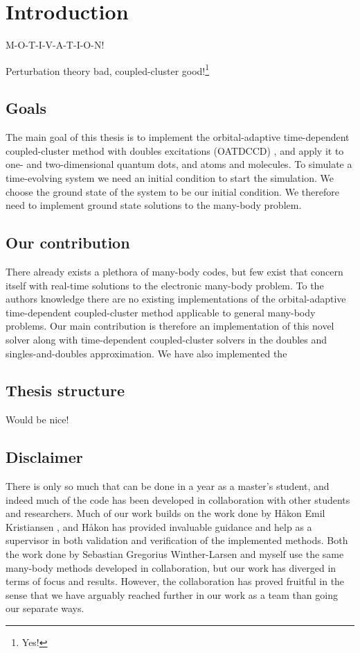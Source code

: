 \chapter{Introduction}
    M-O-T-I-V-A-T-I-O-N!

    Perturbation theory bad, coupled-cluster good!\footnote{Yes!}

    \section{Goals}
        The main goal of this thesis is to implement the orbital-adaptive
        time-dependent coupled-cluster method with doubles excitations (OATDCCD)
        \cite{kvaal2012ab}, and apply it to one- and two-dimensional quantum
        dots, and atoms and molecules.
        To simulate a time-evolving system we need an initial condition to start
        the simulation.
        We choose the ground state of the system to be our initial condition.
        We therefore need to implement ground state solutions to the many-body
        problem.

    \section{Our contribution}
        There already exists a plethora of many-body codes, but few exist that
        concern itself with real-time solutions to the electronic many-body
        problem.
        To the authors knowledge there are no existing implementations of the
        orbital-adaptive time-dependent coupled-cluster method applicable to
        general many-body problems.
        Our main contribution is therefore an implementation of this novel
        solver along with time-dependent coupled-cluster solvers in the doubles
        and singles-and-doubles approximation.
        We have also implemented the

    \section{Thesis structure}
        Would be nice!

    \section{Disclaimer}
        There is only so much that can be done in a year as a master's student,
        and indeed much of the code has been developed in collaboration with
        other students and researchers.
        Much of our work builds on the work done by Håkon Emil Kristiansen
        \cite{kristiansen2017time}, and Håkon has provided invaluable guidance
        and help as a supervisor in both validation and verification of the
        implemented methods.
        Both the work done by Sebastian Gregorius Winther-Larsen
        \cite{greg-winther} and myself use the same many-body methods developed
        in collaboration, but our work has diverged in terms of focus and
        results.
        However, the collaboration has proved fruitful in the sense that we have
        arguably reached further in our work as a team than going our separate
        ways.

